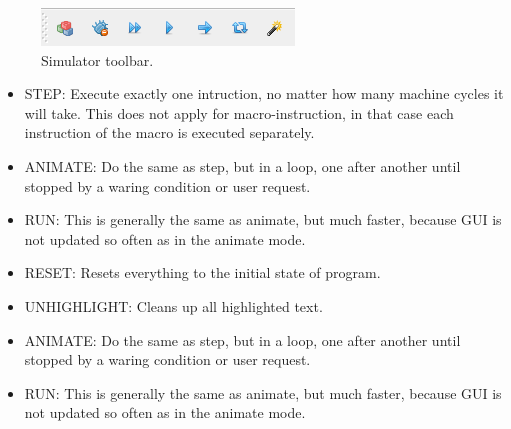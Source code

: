         \begin{figure}[h!]
            \centering{}
            \includegraphics[width=.4\textwidth]{img/simulation_panel.png}
            \caption{Simulator toolbar.}
        \end{figure}

        \begin{itemize}
            \item STEP: Execute exactly one intruction, no matter how many machine cycles it will take. This does not apply for macro-instruction, in that case each instruction of the macro is executed separately.
            \item ANIMATE: Do the same as step, but in a loop, one after another until stopped by a waring condition or user request.
            \item RUN: This is generally the same as animate, but much faster, because GUI is not updated so often as in the animate mode.
            \item RESET: Resets everything to the initial state of program.
            \item UNHIGHLIGHT: Cleans up all highlighted text.

            \item ANIMATE: Do the same as step, but in a loop, one after another until stopped by a waring condition or user request.
            \item RUN: This is generally the same as animate, but much faster, because GUI is not updated so often as in the animate mode.
        \end{itemize}
